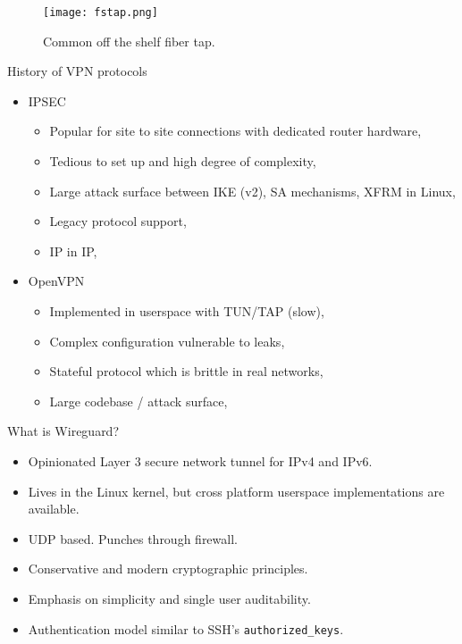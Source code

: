 \documentclass[xcolor=table]{beamer}
\begin{document}
    \begin{frame}
        \begin{figure}
            \texttt{[image: fstap.png]}
            \caption{Common off the shelf fiber tap.}
        \end{figure}
    \end{frame}
    \begin{frame}{History of VPN protocols}
        \begin{itemize}
            \item IPSEC
                \begin{itemize}
                    \item Popular for site to site connections with dedicated router hardware,
                    \item Tedious to set up and high degree of complexity,
                    \item Large attack surface between IKE (v2), SA mechanisms, XFRM in Linux,
                    \item Legacy protocol support,
                    \item IP in IP,
                \end{itemize}
            \item OpenVPN
                \begin{itemize}
                    \item Implemented in userspace with TUN/TAP (slow),
                    \item Complex configuration vulnerable to leaks,
                    \item Stateful protocol which is brittle in real networks,
                    \item Large codebase / attack surface,
                \end{itemize}
        \end{itemize}
    \end{frame}
    \begin{frame}{What is Wireguard?}
        \begin{itemize}
            \item Opinionated Layer 3 secure network tunnel for IPv4 and IPv6.
            \item Lives in the Linux kernel, but cross platform userspace implementations are available.
            \item UDP based. Punches through firewall.
            \item Conservative and modern cryptographic principles.
            \item Emphasis on simplicity and single user auditability.
            \item Authentication model similar to SSH's \texttt{authorized\_keys}.
        \end{itemize}
    \end{frame}
\end{document}
